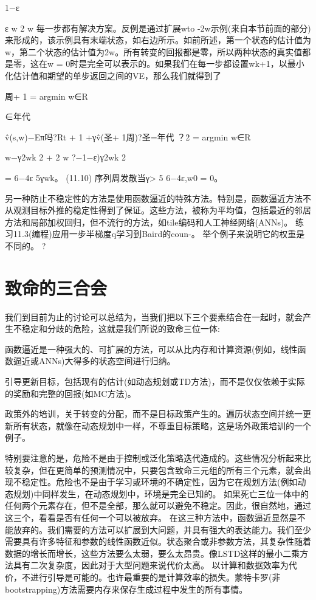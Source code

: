 1−ε



ε
w 2 w
每一步都有解决方案。反例是通过扩展wto -2w示例(来自本节前面的部分)来形成的，该示例具有末端状态，如右边所示。如前所述，第一个状态的估计值为w，第二个状态的估计值为2w。所有转变的回报都是零，所以两种状态的真实值都是零，这在w = 0时是完全可以表示的。如果我们在每一步都设置wk+1，以最小化估计值和期望的单步返回之间的VE，那么我们就得到了


周+ 1 = argmin
w∈R

∈年代

v̂(s,w)−Eπ吗?Rt + 1 +γv̂(圣+ 1周)?圣=年代
？2
= argmin
w∈R

w−γ2wk
2 + 2 w ?−1−ε)γ2wk 2

=
6−4ε
5γwk。 					(11.10)
序列{周}发散当γ> 5 6−4ε,w0 = 0。

另一种防止不稳定性的方法是使用函数逼近的特殊方法。特别是，函数逼近方法不从观测目标外推的稳定性得到了保证。这些方法，被称为平均值，包括最近的邻居方法和局部加权回归，但不流行的方法，如tile编码和人工神经网络(ANNs)。
练习11.3(编程)应用一步半梯度q学习到Baird的coun-。
举个例子来说明它的权重是不同的。 					?


\section{致命的三合会}

我们到目前为止的讨论可以总结为，当我们把以下三个要素结合在一起时，就会产生不稳定和分歧的危险，这就是我们所说的致命三位一体:

函数逼近是一种强大的、可扩展的方法，可以从比内存和计算资源(例如，线性函数逼近或ANNs)大得多的状态空间进行归纳。

引导更新目标，包括现有的估计(如动态规划或TD方法)，而不是仅仅依赖于实际的奖励和完整的回报(如MC方法)。

政策外的培训，关于转变的分配，而不是目标政策产生的。遍历状态空间并统一更新所有状态，就像在动态规划中一样，不尊重目标策略，这是场外政策培训的一个例子。

特别要注意的是，危险不是由于控制或泛化策略迭代造成的。这些情况分析起来比较复杂，但在更简单的预测情况中，只要包含致命三元组的所有三个元素，就会出现不稳定性。危险也不是由于学习或环境的不确定性，因为它在规划方法(例如动态规划)中同样发生，在动态规划中，环境是完全已知的。
如果死亡三位一体中的任何两个元素存在，但不是全部，那么就可以避免不稳定。因此，很自然地，通过这三个，看看是否有任何一个可以被放弃。
在这三种方法中，函数逼近显然是不能放弃的。我们需要的方法可以扩展到大问题，并具有强大的表达能力。我们至少需要具有许多特征和参数的线性函数近似。状态聚合或非参数方法，其复杂性随着数据的增长而增长，这些方法要么太弱，要么太昂贵。像LSTD这样的最小二乘方法具有二次复杂度，因此对于大型问题来说代价太高。
以计算和数据效率为代价，不进行引导是可能的。也许最重要的是计算效率的损失。蒙特卡罗(非bootstrapping)方法需要内存来保存生成过程中发生的所有事情。

